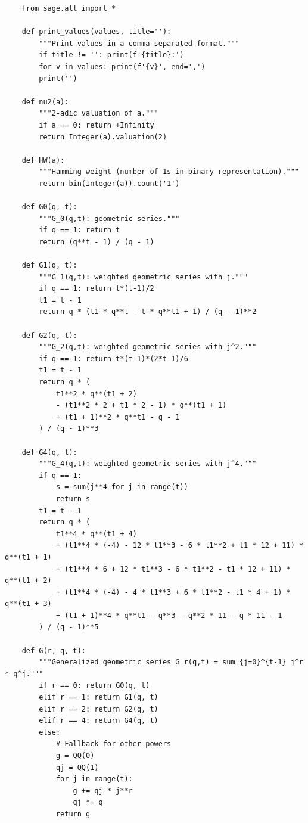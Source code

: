 \documentclass[10pt]{article}
\theoremstyle{plain}
\begin{document}
{\fontsize{8}{9}\selectfont
\begin{verbatim}
    from sage.all import *

    def print_values(values, title=''):
        """Print values in a comma-separated format."""
        if title != '': print(f'{title}:')
        for v in values: print(f'{v}', end=',')
        print('')
    
    def nu2(a):
        """2-adic valuation of a."""
        if a == 0: return +Infinity
        return Integer(a).valuation(2)
    
    def HW(a):
        """Hamming weight (number of 1s in binary representation)."""
        return bin(Integer(a)).count('1')
    
    def G0(q, t):
        """G_0(q,t): geometric series."""
        if q == 1: return t
        return (q**t - 1) / (q - 1)
    
    def G1(q, t):
        """G_1(q,t): weighted geometric series with j."""
        if q == 1: return t*(t-1)/2
        t1 = t - 1
        return q * (t1 * q**t - t * q**t1 + 1) / (q - 1)**2
    
    def G2(q, t):
        """G_2(q,t): weighted geometric series with j^2."""
        if q == 1: return t*(t-1)*(2*t-1)/6
        t1 = t - 1
        return q * (
            t1**2 * q**(t1 + 2)
            - (t1**2 * 2 + t1 * 2 - 1) * q**(t1 + 1)
            + (t1 + 1)**2 * q**t1 - q - 1
        ) / (q - 1)**3
    
    def G4(q, t):
        """G_4(q,t): weighted geometric series with j^4."""
        if q == 1:
            s = sum(j**4 for j in range(t))
            return s
        t1 = t - 1
        return q * (
            t1**4 * q**(t1 + 4)
            + (t1**4 * (-4) - 12 * t1**3 - 6 * t1**2 + t1 * 12 + 11) * q**(t1 + 1)
            + (t1**4 * 6 + 12 * t1**3 - 6 * t1**2 - t1 * 12 + 11) * q**(t1 + 2)
            + (t1**4 * (-4) - 4 * t1**3 + 6 * t1**2 - t1 * 4 + 1) * q**(t1 + 3)
            + (t1 + 1)**4 * q**t1 - q**3 - q**2 * 11 - q * 11 - 1
        ) / (q - 1)**5
    
    def G(r, q, t):
        """Generalized geometric series G_r(q,t) = sum_{j=0}^{t-1} j^r * q^j."""
        if r == 0: return G0(q, t)
        elif r == 1: return G1(q, t)
        elif r == 2: return G2(q, t)
        elif r == 4: return G4(q, t)
        else:
            # Fallback for other powers
            g = QQ(0)
            qj = QQ(1)
            for j in range(t):
                g += qj * j**r
                qj *= q
            return g
    

\end{verbatim}}
\end{document}
